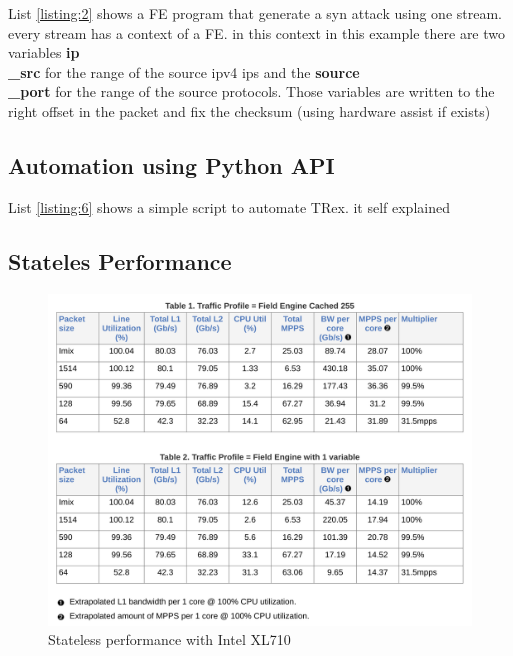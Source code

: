 \documentclass[conference]{IEEEtran}
\begin{document}
List \ref{listing:2} shows a FE program that generate a syn attack using one stream. 
every stream has a context of a FE. in this context in this example there are two variables 
\textbf{ip\\\_src} for the range of the source ipv4 ips and the \textbf{source\\\_port} for the range of the source protocols.
Those variables are written to the right offset in the packet and fix the checksum (using hardware assist if exists)

\subsection{Automation using Python API}

List \ref{listing:6} shows a simple script to automate TRex. it self explained 

 
\subsection{Stateles Performance}

\begin{figure}[h]
  \includegraphics[width=0.4
  \textwidth, center]{stl_perf.png}
  \caption{Stateless performance with Intel XL710}
  \label{fig:stlperf}
\end{figure}
\end{document}
